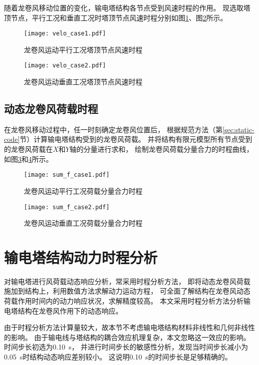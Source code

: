 随着龙卷风移动位置的变化，输电塔结构各节点受到风速时程的作用。
现选取塔顶节点，平行工况和垂直工况时塔顶节点风速时程分别如图\ref{fig:velo_case1}、图\ref{fig:velo_case2}所示。
\begin{figure}[!htpb]
    \centering
    \texttt{[image: velo\_case1.pdf]}
    \caption{龙卷风运动平行工况塔顶节点风速时程}
    \label{fig:velo_case1}
\end{figure}
\begin{figure}[!htpb]
    \centering
    \texttt{[image: velo\_case2.pdf]}
    \caption{龙卷风运动垂直工况塔顶节点风速时程}
    \label{fig:velo_case2}
\end{figure}

\subsection{动态龙卷风荷载时程}

在龙卷风移动过程中，任一时刻确定龙卷风位置后，
根据规范方法（第\ref{sec:static-code}节）计算输电塔结构受到的龙卷风荷载。
并将结构有限元模型所有节点受到的龙卷风荷载在$X$和$Y$轴的分量进行求和，
绘制龙卷风荷载分量合力的时程曲线，如图\ref{fig:sum_f_case1}和\ref{fig:sum_f_case2}所示。
\begin{figure}[!htpb]
    \centering
    \texttt{[image: sum\_f\_case1.pdf]}
    \caption{龙卷风运动平行工况荷载分量合力时程}
    \label{fig:sum_f_case1}
\end{figure}
\begin{figure}[!htpb]
    \centering
    \texttt{[image: sum\_f\_case2.pdf]}
    \caption{龙卷风运动垂直工况荷载分量合力时程}
    \label{fig:sum_f_case2}
\end{figure}

\section{输电塔结构动力时程分析}

对输电塔进行风荷载动态响应分析，常采用时程分析方法，
即将动态龙卷风荷载施加到结构上，利用数值方法求解动力运动方程，
可全面了解结构在龙卷风动态荷载作用时间内的动力响应状况，求解精度较高。
本文采用时程分析方法分析输电塔结构在龙卷风作用下的动态响应。

由于时程分析方法计算量较大，故本节不考虑输电塔结构材料非线性和几何非线性的影响。
由于输电线与塔结构的耦合效应机理复杂，本文忽略这一效应的影响。
时间步长初选为\SI{0.10}{s}，
并进行时间步长的敏感性分析，发现当时间步长减小为\SI{0.05}{s}时结构动态响应差别较小。
这说明\SI{0.10}{s}的时间步长是足够精确的。

